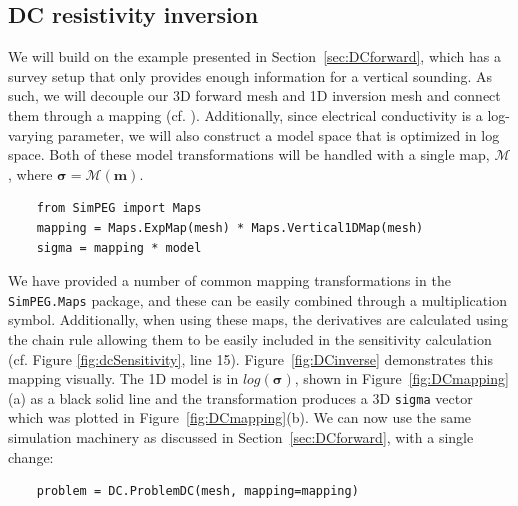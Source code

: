 \documentclass[preprint,review,3p,times,onecolumn,authoryear]{elsarticle}
\begin{document}
\subsection{DC resistivity inversion}

We will build on the example presented in Section~\ref{sec:DCforward}, which has a survey setup that only provides enough information for a vertical sounding.
As such, we will decouple our 3D forward mesh and 1D inversion mesh and connect them through a mapping (cf. \cite{KangSEG2015}).
Additionally, since electrical conductivity is a log-varying parameter, we will also construct a model space that is optimized in log space.
Both of these model transformations will be handled with a single map, $\mathcal{M}$, where $\boldsymbol{\sigma} = \mathcal{M}(\mathbf{m})$.
{%
{\scriptsize\begin{verbatim}
    from SimPEG import Maps
    mapping = Maps.ExpMap(mesh) * Maps.Vertical1DMap(mesh)
    sigma = mapping * model
\end{verbatim}}
}
\noindent
We have provided a number of common mapping transformations in the \texttt{SimPEG.Maps} package, and these can be easily combined through a
multiplication symbol. Additionally, when using these maps, the derivatives are calculated using the chain rule allowing them to be easily
included in the sensitivity calculation (cf. Figure \ref{fig:dcSensitivity}, line 15). Figure~\ref{fig:DCinverse} demonstrates this mapping visually.
The 1D model is in $log(\boldsymbol{\sigma})$, shown in Figure~\ref{fig:DCmapping}(a) as a black solid line and the transformation produces a 3D \texttt{sigma} vector which was plotted in Figure~\ref{fig:DCmapping}(b). We can now use the same simulation machinery as discussed in Section~\ref{sec:DCforward}, with a single change:
{%
{\scriptsize\begin{verbatim}
    problem = DC.ProblemDC(mesh, mapping=mapping)
\end{verbatim}}
}
\end{document}
